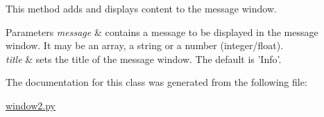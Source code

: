 This method adds and displays content to the message window. 


\begin{DoxyParams}{Parameters}
{\em message} & contains a message to be displayed in the message window. It may be an array, a string or a number (integer/float). \\
\hline
{\em title} & sets the title of the message window. The default is 'Info'. \\
\hline
\end{DoxyParams}


The documentation for this class was generated from the following file\-:\begin{DoxyCompactItemize}
\item 
\hyperlink{window2_8py}{window2.\-py}\end{DoxyCompactItemize}

